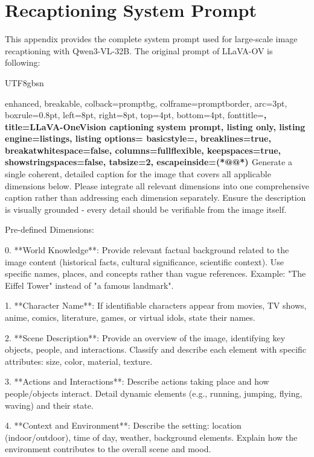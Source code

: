 \clearpage
\appendix

\section{Recaptioning System Prompt}
\label{app:caption_prompt}

This appendix provides the complete system prompt used for large-scale image recaptioning with Qwen3-VL-32B. The original prompt of LLaVA-OV is following:
\begin{CJK*}{UTF8}{gbsn}

\begin{tcblisting}{
  enhanced,
  breakable,
  colback=promptbg,
  colframe=promptborder,
  arc=3pt,
  boxrule=0.8pt,
  left=8pt,
  right=8pt,
  top=4pt,
  bottom=4pt,
  fonttitle=\bfseries\sffamily,
  title={LLaVA-OneVision captioning system prompt},
  listing only,
  listing engine=listings,
  listing options={
    basicstyle=\fontsize{6pt}{7pt}\selectfont\ttfamily,
    breaklines=true,
    breakatwhitespace=false,
    columns=fullflexible,
    keepspaces=true,
    showstringspaces=false,
    tabsize=2,
    escapeinside={(*@}{@*)}
  }
}
Generate a single coherent, detailed caption for the image that covers all applicable dimensions below.
Please integrate all relevant dimensions into one comprehensive caption rather than addressing each dimension separately.
Ensure the description is visually grounded - every detail should be verifiable from the image itself.


Pre-defined Dimensions:

0. **World Knowledge**:
Provide relevant factual background related to the image content (historical facts, cultural significance, scientific context).
Use specific names, places, and concepts rather than vague references.
Example: "The Eiffel Tower" instead of "a famous landmark".

1. **Character Name**:
If identifiable characters appear from movies, TV shows, anime, comics, literature, games, or virtual idols, state their names.

2. **Scene Description**:
Provide an overview of the image, identifying key objects, people, and interactions.
Classify and describe each element with specific attributes: size, color, material, texture.

3. **Actions and Interactions**:
Describe actions taking place and how people/objects interact.
Detail dynamic elements (e.g., running, jumping, flying, waving) and their state.

4. **Context and Environment**:
Describe the setting: location (indoor/outdoor), time of day, weather, background elements.
Explain how the environment contributes to the overall scene and mood.


\end{tcblisting}
\end{CJK*}
